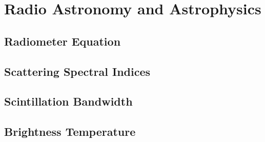 \chapter{Radio Astronomy and Astrophysics}

\section{Radiometer Equation}
\TODO

\section{Scattering Spectral Indices}


\section{Scintillation Bandwidth}
\TODO

\section{Brightness Temperature}
\TODO
